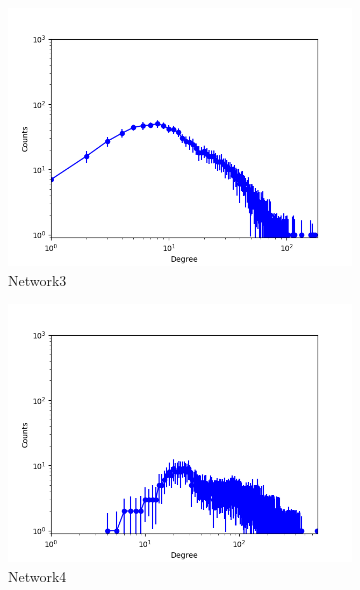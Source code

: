 \begin{figure}[h]
\begin{subfigure}[b]{0.300\textwidth}
            \centering
            \includegraphics[width=\textwidth]{img/corpus/immsb_network3_0}
            \caption {{\small Network3}}    
        \end{subfigure}
        \begin{subfigure}[b]{0.300\textwidth}
            \centering
            \includegraphics[width=\textwidth]{img/corpus/immsb_network4_0}
            \caption {{\small Network4}}    
        \end{subfigure}
        \begin{subfigure}[b]{0.300\textwidth}
            \centering

\end{subfigure}
\end{figure}

